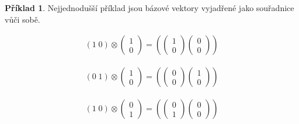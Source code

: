 \documentclass[a5paper,12pt]{amsbook}
\theoremstyle{definition}
\newtheorem{example}{Příklad}[chapter]
\begin{document}
\begin{example}
Nejjednodušší příklad jsou bázové vektory vyjadřené jako souřadnice vůči sobě.

\begin{equation*}
\begin{split}
\left(1 \; 0\right)\otimes\left(\begin{array}{c}1 \\ 0\end{array}\right)
=\left(
\left(\begin{array}{c}1 \\ 0\end{array}\right)
\left(\begin{array}{c}0 \\ 0\end{array}\right)
\right)
\end{split}
\end{equation*}

\begin{equation*}
\begin{split}
\left(0 \; 1\right)\otimes\left(\begin{array}{c}1 \\ 0\end{array}\right)
=\left(
\left(\begin{array}{c}0 \\ 0\end{array}\right)
\left(\begin{array}{c}1 \\ 0\end{array}\right)
\right)
\end{split}
\end{equation*}

\begin{equation*}
\begin{split}
\left(1 \; 0\right)\otimes\left(\begin{array}{c}0 \\ 1\end{array}\right)
=\left(
\left(\begin{array}{c}0 \\ 1\end{array}\right)
\left(\begin{array}{c}0 \\ 0\end{array}\right)
\right)
\end{split}
\end{equation*}


\end{example}
\end{document}
